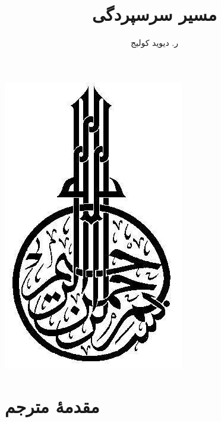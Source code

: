 \documentclass[14pt,oneside]{memoir} %
\title{مسیر سرسپردگی
}
\author{ر. دیوید کولیج
}
\date{}
\begin{document}
\clearpage{}


  \frontmatter
  
\thispagestyle{empty} 
\maketitle\clearpage{}
\newpage %

  \clearpage{}
\thispagestyle{empty} 
\begin{center}
	\includegraphics[height=0.3\textheight]{besm}
\end{center}
\newpage %

\begin{KeepFromToc}
	\tableofcontents
\end{KeepFromToc}
%
\chapter*{مقدمهٔ مترجم}
 \justify
 


\chapter*{}

  
\end{document}
